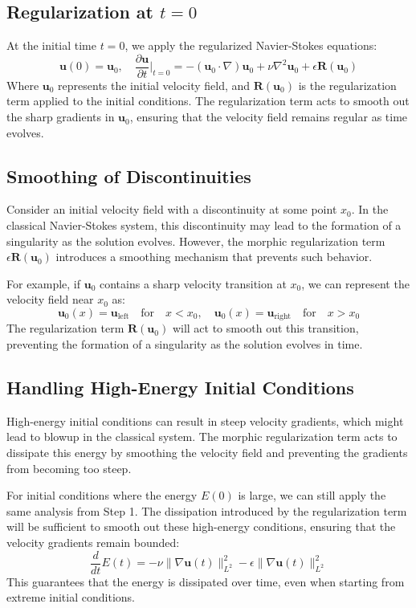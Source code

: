 \documentclass{article}
\begin{document}
\subsection*{Regularization at \( t = 0 \)}

At the initial time \( t = 0 \), we apply the regularized Navier-Stokes equations:
\[
\mathbf{u}(0) = \mathbf{u}_0, \quad \frac{\partial \mathbf{u}}{\partial t}\Big|_{t=0} = -(\mathbf{u}_0 \cdot \nabla)\mathbf{u}_0 + \nu \nabla^2 \mathbf{u}_0 + \epsilon \mathbf{R}(\mathbf{u}_0)
\]
Where \( \mathbf{u}_0 \) represents the initial velocity field, and \( \mathbf{R}(\mathbf{u}_0) \) is the regularization term applied to the initial conditions. The regularization term acts to smooth out the sharp gradients in \( \mathbf{u}_0 \), ensuring that the velocity field remains regular as time evolves.

\subsection*{Smoothing of Discontinuities}

Consider an initial velocity field with a discontinuity at some point \( x_0 \). In the classical Navier-Stokes system, this discontinuity may lead to the formation of a singularity as the solution evolves. However, the morphic regularization term \( \epsilon \mathbf{R}(\mathbf{u}_0) \) introduces a smoothing mechanism that prevents such behavior.

For example, if \( \mathbf{u}_0 \) contains a sharp velocity transition at \( x_0 \), we can represent the velocity field near \( x_0 \) as:
\[
\mathbf{u}_0(x) = \mathbf{u}_{\text{left}} \quad \text{for} \quad x < x_0, \quad \mathbf{u}_0(x) = \mathbf{u}_{\text{right}} \quad \text{for} \quad x > x_0
\]
The regularization term \( \mathbf{R}(\mathbf{u}_0) \) will act to smooth out this transition, preventing the formation of a singularity as the solution evolves in time.

\subsection*{Handling High-Energy Initial Conditions}

High-energy initial conditions can result in steep velocity gradients, which might lead to blowup in the classical system. The morphic regularization term acts to dissipate this energy by smoothing the velocity field and preventing the gradients from becoming too steep. 

For initial conditions where the energy \( E(0) \) is large, we can still apply the same analysis from Step 1. The dissipation introduced by the regularization term will be sufficient to smooth out these high-energy conditions, ensuring that the velocity gradients remain bounded:
\[
\frac{d}{dt} E(t) = -\nu \|\nabla \mathbf{u}(t)\|_{L^2}^2 - \epsilon \|\nabla \mathbf{u}(t)\|_{L^2}^2
\]
This guarantees that the energy is dissipated over time, even when starting from extreme initial conditions.
\end{document}
